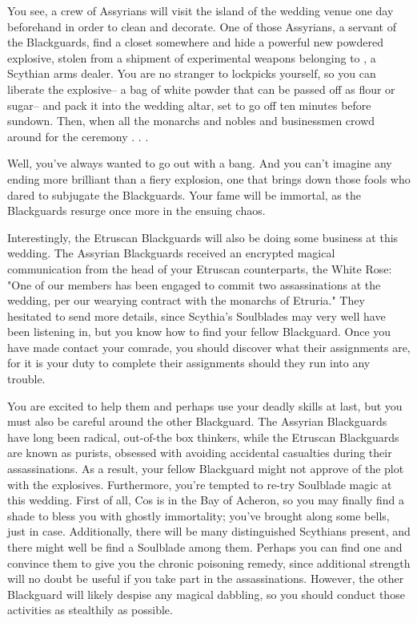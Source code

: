 \documentclass[char]{Kos}
\begin{document}
You see, a crew of Assyrians will visit the island of the wedding venue one day beforehand in order to clean and decorate. One of those Assyrians, a servant of the Blackguards, find a closet somewhere and hide a powerful new powdered explosive, stolen from a shipment of experimental weapons belonging to \cArmsDealer{}, a Scythian arms dealer. You are no stranger to lockpicks yourself, so you can liberate the explosive-- a bag of white powder that can be passed off as flour or sugar-- and pack it into the wedding altar, set to go off ten minutes before sundown. Then, when all the monarchs and nobles and businessmen crowd around for the ceremony . . .

Well, you've always wanted to go out with a bang. And you can't imagine any ending more brilliant than a fiery explosion, one that brings down those fools who dared to subjugate the Blackguards. Your fame will be immortal, as the Blackguards resurge once more in the ensuing chaos.

Interestingly, the Etruscan Blackguards will also be doing some business at this wedding. The Assyrian Blackguards received an encrypted magical communication from the head of your Etruscan counterparts, the White Rose: "One of our members has been engaged to commit two assassinations at the wedding, per our wearying contract with the monarchs of Etruria." They hesitated to send more details, since Scythia's Soulblades may very well have been listening in, but you know how to find your fellow Blackguard. Once you have made contact your comrade, you should discover what their assignments are, for it is your duty to complete their assignments should they run into any trouble.

You are excited to help them and perhaps use your deadly skills at last, but you must also be careful around the other Blackguard. The Assyrian Blackguards have long been radical, out-of-the box thinkers, while the Etruscan Blackguards are known as purists, obsessed with avoiding accidental casualties during their assassinations. As a result, your fellow Blackguard might not approve of the plot with the explosives. Furthermore, you're tempted to re-try Soulblade magic at this wedding. First of all, Cos is in the Bay of Acheron, so you may finally find a shade to bless you with ghostly immortality; you've brought along some bells, just in case. Additionally, there will be many distinguished Scythians present, and there might well be find a Soulblade among them. Perhaps you can find one and convince them to give you the chronic poisoning remedy, since additional strength will no doubt be useful if you take part in the assassinations. However, the other Blackguard will likely despise any magical dabbling, so you should conduct those activities as stealthily as possible.
\end{document}
